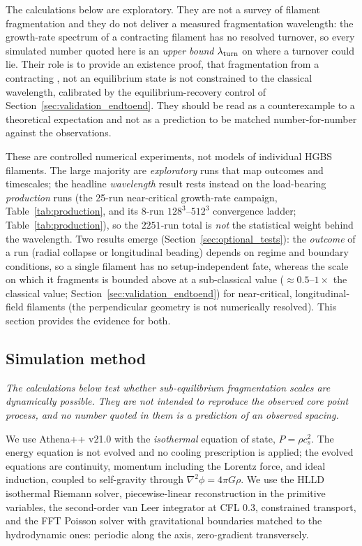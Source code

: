 \documentclass[usenatbib,twoside,twocolumn]{mnras}
\begin{document}
\noindent The calculations below are exploratory. They are not a survey of filament fragmentation and they do not deliver a measured fragmentation wavelength: the growth-rate spectrum of a contracting filament has no resolved turnover, so every simulated number quoted here is an \emph{upper bound} $\lambda_{\rm turn}$ on where a turnover could lie. Their role is to provide an existence proof, that fragmentation from a contracting , not an equilibrium state is not constrained to the classical wavelength, calibrated by the equilibrium-recovery control of Section~\ref{sec:validation_endtoend}. They should be read as a counterexample to a theoretical expectation and not as a prediction to be matched number-for-number against the observations.

These are controlled numerical experiments, not models of individual HGBS filaments. The large majority are \emph{exploratory} runs that map outcomes and timescales; the headline \emph{wavelength} result rests instead on the load-bearing \emph{production} runs (the 25-run near-critical growth-rate campaign, Table~\ref{tab:production}, and its 8-run $128^3$--$512^3$ convergence ladder; Table~\ref{tab:production}), so the $2251$-run total is \emph{not} the statistical weight behind the wavelength. Two results emerge (Section~\ref{sec:optional_tests}): the \emph{outcome} of a run (radial collapse or longitudinal beading) depends on regime and boundary conditions, so a single filament has no setup-independent fate, whereas the scale on which it fragments is bounded above at a sub-classical value ($\approx0.5$--$1\times$ the classical value; Section~\ref{sec:validation_endtoend}) for near-critical, longitudinal-field filaments (the perpendicular geometry is not numerically resolved). This section provides the evidence for both.

\subsection{Simulation method}
\label{sec:simmethod}

\smallskip\noindent\emph{The calculations below test whether sub-equilibrium fragmentation scales are dynamically possible. They are not intended to reproduce the observed core point process, and no number quoted in them is a prediction of an observed spacing.}

\smallskip We use Athena++ v21.0 \citep{Stone2020} with the \emph{isothermal} equation of state, $P=\rho c_s^2$. The energy equation is not evolved and no cooling prescription is applied; the evolved equations are continuity, momentum including the Lorentz force, and ideal induction, coupled to self-gravity through $\nabla^2\phi=4\pi G\rho$. We use the HLLD isothermal Riemann solver, piecewise-linear reconstruction in the primitive variables, the second-order van Leer integrator at CFL $0.3$, constrained transport, and the FFT Poisson solver with gravitational boundaries matched to the hydrodynamic ones: periodic along the axis, zero-gradient transversely.
\end{document}

